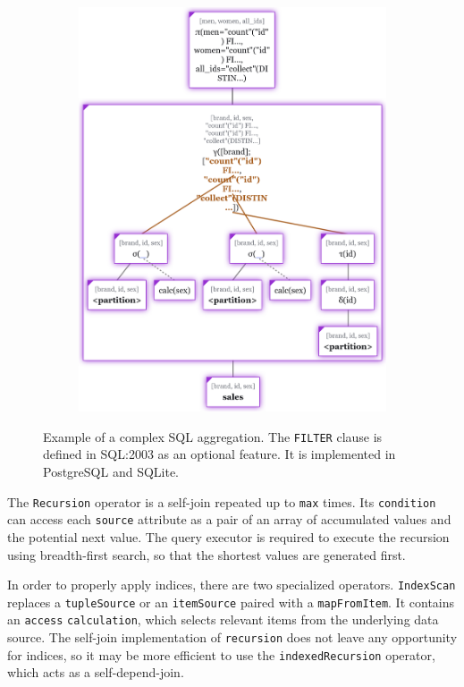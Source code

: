 \begin{figure}[htpb]
    \begin{subfigure}[b]{\textwidth}
        \centering
        \includegraphics[width=380pt]{img/tree-groupby.png}
    \end{subfigure}
    
    \caption{Example of a complex SQL aggregation. The \texttt{FILTER} clause is defined in SQL:2003 as an optional feature. It is implemented in PostgreSQL and SQLite.}
\end{figure}

The \texttt{Recursion} operator is a self-join repeated up to \texttt{max} times. Its \texttt{condition} can access each \texttt{source} attribute as a pair of an array of accumulated values and the potential next value. The query executor is required to execute the recursion using breadth-first search, so that the shortest values are generated first.

\pagebreak

In order to properly apply indices, there are two specialized operators. \texttt{Index\-Scan} replaces a \texttt{tupleSource} or an \texttt{itemSource} paired with a \texttt{mapFromItem}. It contains an \texttt{access} \texttt{calculation}, which selects relevant items from the underlying data source. The self-join implementation of \texttt{recursion} does not leave any opportunity for indices, so it may be more efficient to use the \texttt{indexedRecursion} operator, which acts as a self-depend-join.

